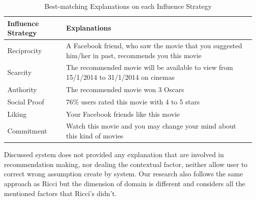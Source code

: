 \begin{table}[ht]
	\centering %
	\begin{tabular}{p{2cm} p{12cm}}  %
		\hline\hline %
		Influence Strategy & Explanations \\ %
		\hline %
		Reciprocity & A Facebook friend, who saw the movie that you suggested him/her in past, recommends you this movie \\ %
		Scarcity & The recommended movie will be available to view from 15/1/2014 to 31/1/2014 on cinemas \\
		Authority & The recommended movie won 3 Oscars\\
		Social Proof & 76\% users rated this movie with 4 to 5 stars\\
		Liking & Your Facebook friends like this movie \\
		Commitment & Watch this movie and you may change your mind about this kind of movies\\ [1ex] %
		\hline %
	\end{tabular}
	\caption{Best-matching Explanations on each Influence Strategy}
	\label{table:best-matching-explanations}
\end{table}


Discussed system does not provided any explanation that are involved in recommendation making, nor dealing the contextual factor, neither allow user to correct wrong assumption create by system. Our research also follows the same approach as Ricci but the dimension of domain is different and considers all the mentioned factors that Ricci’s didn’t.


